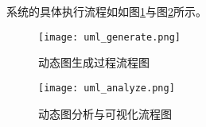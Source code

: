 


系统的具体执行流程如如图\ref{fig:uml_generate}与图\ref{fig:uml_analyze}所示。

\begin{figure}[H]
  \centering
  \texttt{[image: uml\_generate.png]}
  \caption{动态图生成过程流程图}
  \label{fig:uml_generate}
\end{figure}

\begin{figure}[H]
  \centering
  \texttt{[image: uml\_analyze.png]}
  \caption{动态图分析与可视化流程图}
  \label{fig:uml_analyze}
\end{figure}